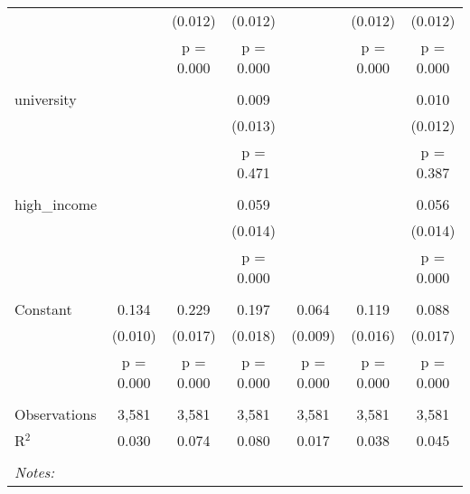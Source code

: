 \begin{table}[!htbp]
\begin{tabular}{@{\extracolsep{5pt}}lcccccc}
  &  & (0.012) & (0.012) &  & (0.012) & (0.012) \\ 
  &  & p = 0.000 & p = 0.000 &  & p = 0.000 & p = 0.000 \\ 
  & & & & & & \\ 
 university &  &  & 0.009 &  &  & 0.010 \\ 
  &  &  & (0.013) &  &  & (0.012) \\ 
  &  &  & p = 0.471 &  &  & p = 0.387 \\ 
  & & & & & & \\ 
 high\_income &  &  & 0.059 &  &  & 0.056 \\ 
  &  &  & (0.014) &  &  & (0.014) \\ 
  &  &  & p = 0.000 &  &  & p = 0.000 \\ 
  & & & & & & \\ 
 Constant & 0.134 & 0.229 & 0.197 & 0.064 & 0.119 & 0.088 \\ 
  & (0.010) & (0.017) & (0.018) & (0.009) & (0.016) & (0.017) \\ 
  & p = 0.000 & p = 0.000 & p = 0.000 & p = 0.000 & p = 0.000 & p = 0.000 \\ 
  & & & & & & \\ 
Observations & 3,581 & 3,581 & 3,581 & 3,581 & 3,581 & 3,581 \\ 
R$^{2}$ & 0.030 & 0.074 & 0.080 & 0.017 & 0.038 & 0.045 \\ 
\hline \\[-1.8ex] 
\textit{Notes:} & \multicolumn{6}{l}{} \\ 
\end{tabular} 
\end{table} 
